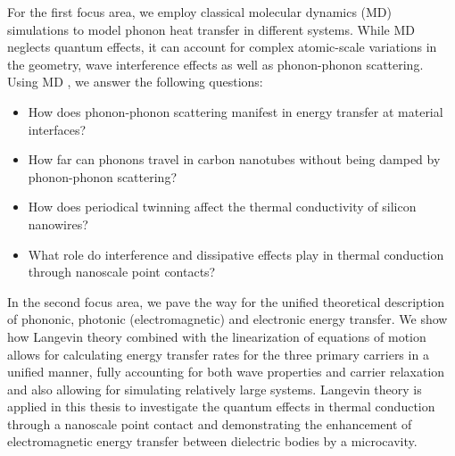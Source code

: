 For the first focus area, we employ classical molecular dynamics (MD) simulations to model phonon heat transfer in different systems. While MD neglects quantum effects, it can account for complex atomic-scale variations in the geometry, wave interference effects as well as phonon-phonon scattering. Using MD , we answer the following questions: 
 \begin{itemize}
  \item How does phonon-phonon scattering manifest in energy transfer at material interfaces?
  \item How far can phonons travel in carbon nanotubes without being damped by phonon-phonon scattering?
  \item How does periodical twinning affect the thermal conductivity of silicon nanowires?
  \item What role do interference and dissipative effects play in thermal conduction through nanoscale point contacts?
 \end{itemize}


In the second focus area, we pave the way for the unified theoretical description of phononic, photonic (electromagnetic) and electronic energy transfer. We show how Langevin theory \cite{langevin08,zwanzig} combined with the linearization of equations of motion allows for calculating energy transfer rates for the three primary carriers in a unified manner, fully accounting for both wave properties and carrier relaxation and also allowing for simulating relatively large systems.  Langevin theory is applied in this thesis to investigate the quantum effects in thermal conduction through a nanoscale point contact and demonstrating the enhancement of electromagnetic energy transfer between dielectric bodies by a microcavity.


